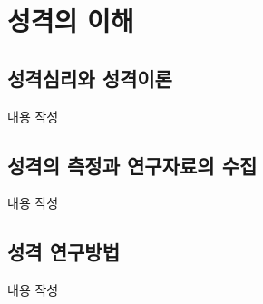 \section{성격의 이해}

\subsection{성격심리와 성격이론}
내용 작성

\subsection{성격의 측정과 연구자료의 수집}
내용 작성

\subsection{성격 연구방법}
내용 작성